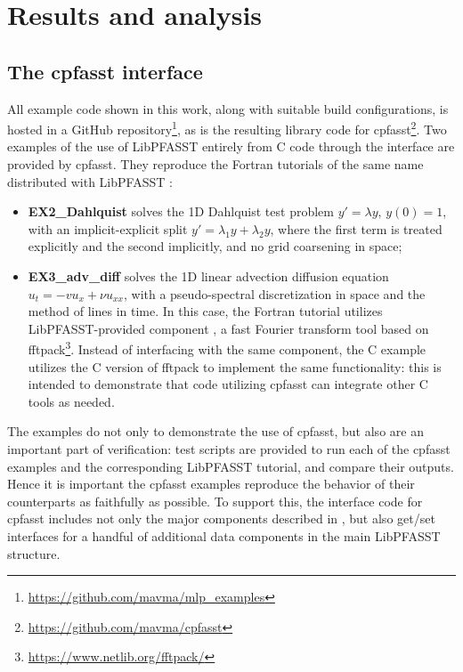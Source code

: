\chapter{Results and analysis}
\label{chapter:results}

\section{The cpfasst interface}

All example code shown in this work, along with suitable build configurations, is hosted in a GitHub repository\footnote{\url{https://github.com/mavma/mlp_examples}}, as is the resulting library code for cpfasst\footnote{\url{https://github.com/mavma/cpfasst}}. Two examples of the use of LibPFASST entirely from C code through the interface are provided by cpfasst. They reproduce the Fortran tutorials of the same name distributed with LibPFASST \cite{libpfasst_ug}:
\begin{itemize}
	\item \textbf{EX2\_Dahlquist} solves the 1D Dahlquist test problem \(y' = \lambda y,\,y(0) = 1\), with an implicit-explicit split \(y' = \lambda_1 y + \lambda_2 y\), where the first term is treated explicitly and the second implicitly, and no grid coarsening in space;
	\item \textbf{EX3\_adv\_diff} solves the 1D linear advection diffusion equation \(u_t = -v u_x + \nu u_{xx}\), with a pseudo-spectral discretization in space and the method of lines in time. In this case, the Fortran tutorial utilizes LibPFASST-provided component , a fast Fourier transform tool based on fftpack\footnote{\url{https://www.netlib.org/fftpack/}}. Instead of interfacing with the same component, the C example utilizes the C version of fftpack to implement the same functionality: this is intended to demonstrate that code utilizing cpfasst can integrate other C tools as needed.
\end{itemize}

The examples do not only to demonstrate the use of cpfasst, but also are an important part of verification: test scripts are provided to run each of the cpfasst examples and the corresponding LibPFASST tutorial, and compare their outputs. Hence it is important the cpfasst examples reproduce the behavior of their counterparts as faithfully as possible. To support this, the interface code for cpfasst includes not only the major components described in , but also get/set interfaces for a handful of additional data components in the main LibPFASST structure.

